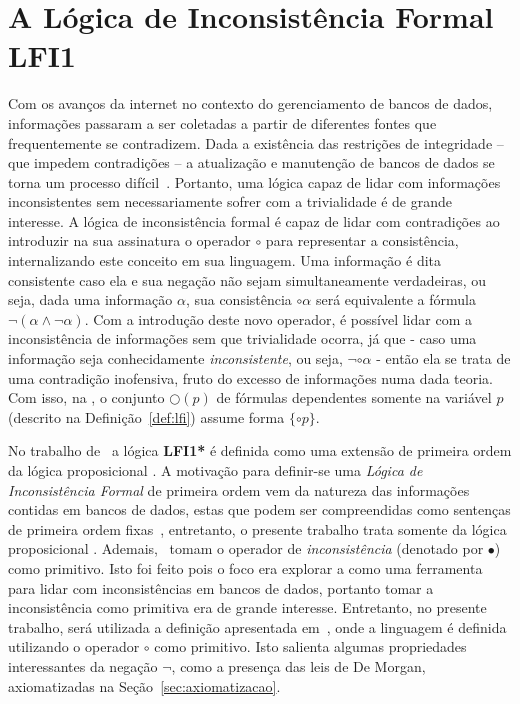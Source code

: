 \chapter{A Lógica de Inconsistência Formal LFI1}\label{cap:LFI1}

Com os avanços da internet no contexto do gerenciamento de bancos de dados, informações passaram a ser coletadas a partir de diferentes fontes que frequentemente se contradizem. Dada a existência das restrições de integridade {--} que impedem contradições {--} a atualização e manutenção de bancos de dados se torna um processo difícil~\cite{carnielli2000formal}. Portanto, uma lógica capaz de lidar com informações inconsistentes sem necessariamente sofrer com a trivialidade é de grande interesse. A lógica de inconsistência formal \lfium{} é capaz de lidar com contradições ao introduzir na sua assinatura o operador $\circ$ para representar a consistência, internalizando este conceito em sua linguagem. Uma informação é dita consistente caso ela e sua negação não sejam simultaneamente verdadeiras, ou seja, dada uma informação $\alpha$, sua consistência $\circ \alpha$ será equivalente a fórmula $\neg (\alpha \land \neg \alpha)$. Com a introdução deste novo operador, é possível lidar com a inconsistência de informações sem que trivialidade ocorra, já que {-} caso uma informação seja conhecidamente \textit{inconsistente}, ou seja, $\neg \circ \alpha$ {-} então ela se trata de uma contradição inofensiva, fruto do excesso de informações numa dada teoria. Com isso, na \lfium{}, o conjunto $\bigcirc(p)$ de fórmulas dependentes somente na variável $p$ (descrito na Definição~\ref{def:lfi}) assume forma $\{\circ p\}$.

No trabalho de~ a lógica \textbf{LFI1*} é definida como uma extensão de primeira ordem da lógica proposicional \lfium{}. A motivação para definir-se uma \textit{Lógica de Inconsistência Formal} de primeira ordem vem da natureza das informações contidas em bancos de dados, estas que podem ser compreendidas como sentenças de primeira ordem fixas~\cite{Codd}, entretanto, o presente trabalho trata somente da lógica proposicional \lfium{}. Ademais,~ tomam o operador de \textit{inconsistência} (denotado por $\bullet$) como primitivo. Isto foi feito pois o foco era explorar a \lfium{} como uma ferramenta para lidar com inconsistências em bancos de dados, portanto tomar a inconsistência como primitiva era de grande interesse. Entretanto, no presente trabalho, será utilizada a definição apresentada em~, onde a linguagem é definida utilizando o operador $\circ$ como primitivo. Isto salienta algumas propriedades interessantes da negação $\neg$, como a presença das leis de De Morgan, axiomatizadas na Seção~\ref{sec:axiomatizacao}.

